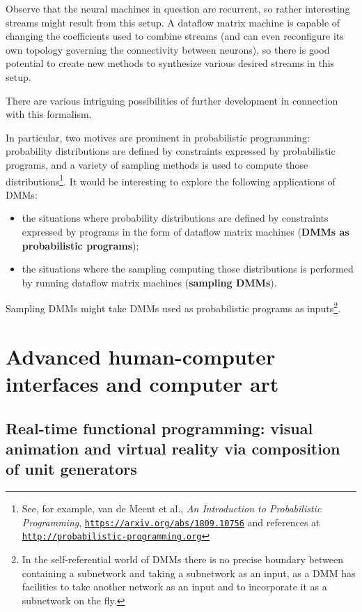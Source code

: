 \documentclass{article}
\begin{document}
Observe that the neural machines in question are recurrent, so rather interesting streams might result from this setup.
A dataflow matrix machine is capable of changing the coefficients used to combine streams (and can even reconfigure its own topology governing the connectivity between neurons),
so there is good potential to create new methods to synthesize various desired streams in this setup.

There are various intriguing possibilities of further development in connection with this formalism.

In particular, two motives are prominent in probabilistic programming: probability distributions are defined
by constraints expressed by probabilistic programs, and a variety of sampling methods is used
to compute those distributions\footnote{See, for example, van  de Meent et al., {\em An Introduction to Probabilistic Programming}, 
\href{https://arxiv.org/abs/1809.10756}{\tt https://arxiv.org/abs/1809.10756} and references at \href{http://probabilistic-programming.org}{\tt http://probabilistic-programming.org} }.
It would be interesting to explore the following applications of DMMs:
  \begin{itemize}
      \item the situations where probability distributions are defined by
constraints expressed by programs in the form of dataflow matrix machines ({\bf DMMs as probabilistic programs});
     \item the situations where the sampling
computing those distributions is performed by running dataflow matrix machines ({\bf sampling DMMs}).
  \end{itemize}
Sampling DMMs might take  DMMs  used as probabilistic programs as inputs\footnote{In 
the self-referential world of DMMs there is no precise boundary between containing a subnetwork and taking a subnetwork as an input, as a DMM has facilities
to take another network as an input and to incorporate it as a subnetwork on the fly.}.

\section{Advanced human-computer interfaces and computer art}

\subsection{Real-time functional programming: visual animation and virtual reality via composition
of unit generators}
\end{document}
